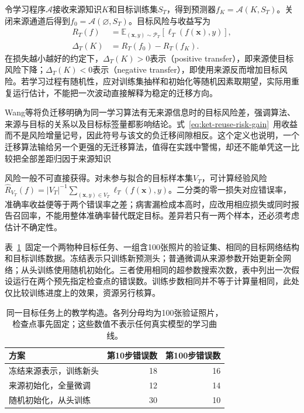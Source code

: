 令学习程序$\mathcal A$接收来源知识$K$和目标训练集$S_T$，得到预测器$f_K=\mathcal A(K,S_T)$。关闭来源通道后得到$f_0=\mathcal A(\varnothing,S_T)$。目标风险与收益写为
\begin{equation}
  \begin{aligned}
    R_T(f)&=\mathbb E_{(\bm{x},y)\sim\mathcal P_T}
      [\ell_T(f(\bm{x}),y)],\\
    \Delta_T(K)&=R_T(f_0)-R_T(f_K).
  \end{aligned}
  \label{eq:ket-reuse-risk-gain}
\end{equation}
在损失越小越好的约定下，$\Delta_T(K)>0$表示（positive transfer），即来源使目标风险下降；$\Delta_T(K)<0$表示（negative transfer），即使用来源反而增加目标风险。若学习过程有随机性，应对训练集抽样和初始化等随机因素取期望，实际用重复运行估计，不能把一次波动直接解释为稳定的迁移方向。

Wang等将负迁移明确为同一学习算法有无来源信息时的目标风险差，强调算法、来源与目标的关系以及目标标签量都影响结论。式~\eqref{eq:ket-reuse-risk-gain}~用收益而不是风险增量记号，因此符号与该文的负迁移间隙相反。这个定义也说明，一个迁移算法输给另一个更强的无迁移算法，值得在实践中警惕，却还不能单凭这一比较把全部差距归因于来源知识

风险一般不可直接获得。对未参与拟合的目标样本集$V_T$，可计算经验风险$\hat R_{V_T}(f)=|V_T|^{-1}\sum_{(\bm{x},y)\in V_T}\ell_T(f(\bm{x}),y)$。二分类的零一损失对应错误率，准确率收益便等于两个错误率之差；病害漏检成本高时，应改用相应损失或同时报告召回率，不能用整体准确率替代既定目标。差异若只有一两个样本，还必须考虑估计不确定性。

表~\ref{tab:ket-reuse-checkpoints}~固定一个两物种目标任务、一组含100张照片的验证集、相同的目标网络结构和目标训练数据。冻结表示只训练新预测头；普通微调从来源参数开始更新全网络；从头训练使用随机初始化。三者使用相同的超参数搜索次数，表中列出一次假设运行在两个预先指定检查点的错误数。训练步数相同并不等于计算量相同，此处仅比较训练进度上的效果，资源另行核算。

\begin{table}[htbp]
  \centering
  \small
  \begin{tabularx}{\linewidth}{Xrr}
    \toprule
    方案 & 第10步错误数 & 第100步错误数 \\
    \midrule
    冻结来源表示，训练新头 & 18 & 16 \\
    来源初始化，全量微调 & 12 & 14 \\
    随机初始化，从头训练 & 30 & 10 \\
    \bottomrule
  \end{tabularx}
  \caption{同一目标任务上的教学构造。各列分母均为100张验证照片，检查点事先固定；这些数值不表示任何真实模型的学习曲线。}
  \label{tab:ket-reuse-checkpoints}
\end{table}

